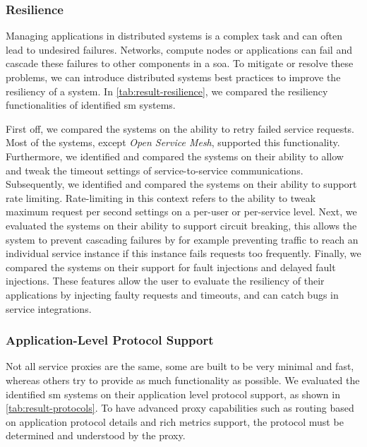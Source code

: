 \subsubsection{Resilience}
\label{sec:survey:results:comparison:resilience}




Managing applications in distributed systems is a complex task and can often lead to undesired failures. Networks, compute nodes or applications can fail and cascade these failures to other components in a \gls{soa}. To mitigate or resolve these problems, we can introduce distributed systems best practices to improve the resiliency of a system. In \cref{tab:result-resilience}, we compared the resiliency functionalities of identified \gls{sm} systems. 

First off, we compared the systems on the ability to retry failed service requests. Most of the systems, except \textit{Open Service Mesh}, supported this functionality. Furthermore, we identified and compared the systems on their ability to allow and tweak the timeout settings of service-to-service communications. Subsequently, we identified and compared the systems on their ability to support rate limiting. Rate-limiting in this context refers to the ability to tweak maximum request per second settings on a per-user or per-service level. Next, we evaluated the systems on their ability to support circuit breaking, this allows the system to prevent cascading failures by for example preventing traffic to reach an individual service instance if this instance fails requests too frequently. Finally, we compared the systems on their support for fault injections and delayed fault injections. These features allow the user to evaluate the resiliency of their applications by injecting faulty requests and timeouts, and can catch bugs in service integrations.


\subsubsection{Application-Level Protocol Support}
\label{sec:survey:results:comparison:protocols}





Not all service proxies are the same, some are built to be very minimal and fast, whereas others try to provide as much functionality as possible. We evaluated the identified \gls{sm} systems on their application level protocol support, as shown in \cref{tab:result-protocols}. To have advanced proxy capabilities such as routing based on application protocol details and rich metrics support, the protocol must be determined and understood by the proxy. 

